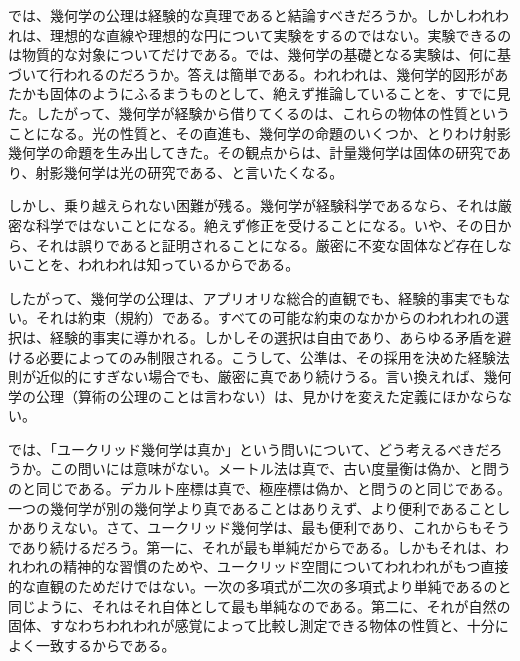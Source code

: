 \documentclass[a4paper,11pt,openany]{ltjsbook}
\begin{document}
では、幾何学の公理は経験的な真理であると結論すべきだろうか。しかしわれわれは、理想的な直線や理想的な円について実験をするのではない。実験できるのは物質的な対象についてだけである。では、幾何学の基礎となる実験は、何に基づいて行われるのだろうか。答えは簡単である。われわれは、幾何学的図形があたかも固体のようにふるまうものとして、絶えず推論していることを、すでに見た。したがって、幾何学が経験から借りてくるのは、これらの物体の性質ということになる。光の性質と、その直進も、幾何学の命題のいくつか、とりわけ射影幾何学の命題を生み出してきた。その観点からは、計量幾何学は固体の研究であり、射影幾何学は光の研究である、と言いたくなる。

しかし、乗り越えられない困難が残る。幾何学が経験科学であるなら、それは厳密な科学ではないことになる。絶えず修正を受けることになる。いや、その日から、それは誤りであると証明されることになる。厳密に不変な固体など存在しないことを、われわれは知っているからである。

したがって、幾何学の公理は、アプリオリな総合的直観でも、経験的事実でもない。それは約束（規約）である。すべての可能な約束のなかからのわれわれの選択は、経験的事実に導かれる。しかしその選択は自由であり、あらゆる矛盾を避ける必要によってのみ制限される。こうして、公準は、その採用を決めた経験法則が近似的にすぎない場合でも、厳密に真であり続けうる。言い換えれば、幾何学の公理（算術の公理のことは言わない）は、見かけを変えた定義にほかならない。

では、「ユークリッド幾何学は真か」という問いについて、どう考えるべきだろうか。この問いには意味がない。メートル法は真で、古い度量衡は偽か、と問うのと同じである。デカルト座標は真で、極座標は偽か、と問うのと同じである。一つの幾何学が別の幾何学より真であることはありえず、より便利であることしかありえない。さて、ユークリッド幾何学は、最も便利であり、これからもそうであり続けるだろう。第一に、それが最も単純だからである。しかもそれは、われわれの精神的な習慣のためや、ユークリッド空間についてわれわれがもつ直接的な直観のためだけではない。一次の多項式が二次の多項式より単純であるのと同じように、それはそれ自体として最も単純なのである。第二に、それが自然の固体、すなわちわれわれが感覚によって比較し測定できる物体の性質と、十分によく一致するからである。
\end{document}
